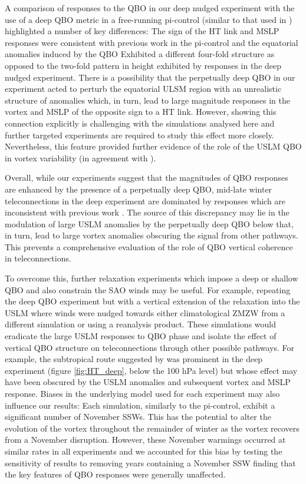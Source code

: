 A comparison of responses to the QBO in our deep nudged experiment with the use of a deep QBO metric in a free-running pi-control (similar to that used in \cite{andrewsObserved2019d}) highlighted a number of key differences: The sign of the HT link and MSLP responses were consistent with previous work in the pi-control and the equatorial anomalies induced by the QBO Exhibited a different four-fold structure as opposed to the two-fold pattern in height exhibited by responses in the deep nudged experiment. There is a possibility that the perpetually deep QBO in our experiment acted to perturb the equatorial ULSM region with an unrealistic structure of anomalies which, in turn, lead to large magnitude responses in the vortex and MSLP of the opposite sign to a HT link. However, showing this connection explicitly is challenging with the simulations analysed here and further targeted experiments are required to study this effect more closely. Nevertheless, this feature provided further evidence of the role of the USLM QBO in vortex variability (in agreement with \cite{grayForecasting2020a}). 

Overall, while our experiments suggest that the magnitudes of QBO responses are enhanced by the presence of a perpetually deep QBO, mid-late winter teleconnections in the deep experiment are dominated by responses which are inconsistent with previous work \citep{graySurface2018b, andrewsObserved2019d}. The source of this discrepancy may lie in the modulation of large USLM anomalies by the perpetually deep QBO below that, in turn, lead to large vortex anomalies obscuring the signal from other pathways. This prevents a comprehensive evaluation of the role of QBO vertical coherence in teleconnections. 

To overcome this, further relaxation experiments which impose a deep or shallow QBO and also constrain the SAO winds may be useful. For example, repeating the deep QBO experiment but with a vertical extension of the relaxation into the USLM where winds were nudged towards either climatological ZMZW from a different simulation or using a reanalysis product. These simulations would eradicate the large USLM responses to QBO phase and isolate the effect of vertical QBO structure on teleconnections through other possible pathways. For example, the subtropical route suggested by \cite{graySurface2018b} was prominent in the deep experiment (figure \ref{fig:HT_deep}, below the 100 hPa level) but whose effect may have been obscured by the USLM anomalies and subsequent vortex and MSLP response. Biases in the underlying model used for each experiment may also influence our results: Each simulation, similarly to the pi-control, exhibit a significant number of November SSWs. This has the potential to alter the evolution of the vortex throughout the remainder of winter as the vortex recovers from a November disruption. However, these November warmings occurred at similar rates in all experiments and we accounted for this bias by testing the sensitivity of results to removing years containing a November SSW finding that the key features of QBO responses were generally unaffected.

